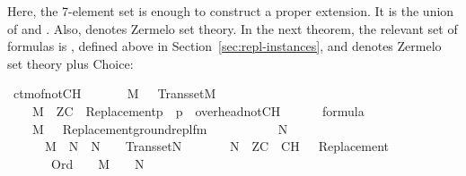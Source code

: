 Here, the 7-element set  is enough to construct a proper
extension. It is  the union of
 and
.
Also,
 denotes Zermelo set theory. In the
next theorem, the relevant set of formulas is
, defined above in
Section~\ref{sec:repl-instances}, and  denotes Zermelo set
theory plus Choice:

\begin{isabelle}
\isamarkupfalse%
\ ctm{\isacharunderscore}{\kern0pt}of{\isacharunderscore}{\kern0pt}not{\isacharunderscore}{\kern0pt}CH{\isacharcolon}{\kern0pt}\isanewline
\ \ \isanewline
\ \ \ \ {\isachardoublequoteopen}M\ {\isasymapprox}\ {\isasymomega}{\isachardoublequoteclose}\ {\isachardoublequoteopen}Transset{\isacharparenleft}{\kern0pt}M{\isacharparenright}{\kern0pt}{\isachardoublequoteclose}\isanewline
\ \ \ \ {\isachardoublequoteopen}M\ {\isasymTurnstile}\ ZC\ {\isasymunion}\ {\isacharbraceleft}{\kern0pt}{\isasymcdot}Replacement{\isacharparenleft}{\kern0pt}p{\isacharparenright}{\kern0pt}{\isasymcdot}\ {\isachardot}{\kern0pt}\ p\ {\isasymin}\ overhead{\isacharunderscore}{\kern0pt}notCH{\isacharbraceright}{\kern0pt}{\isachardoublequoteclose}\isanewline
\ \ \ \ {\isachardoublequoteopen}{\isasymPhi}\ {\isasymsubseteq}\ formula{\isachardoublequoteclose}\isanewline
\ \ \ \ {\isachardoublequoteopen}M\ {\isasymTurnstile}\ {\isacharbraceleft}{\kern0pt}\ {\isasymcdot}Replacement{\isacharparenleft}{\kern0pt}ground{\isacharunderscore}{\kern0pt}repl{\isacharunderscore}{\kern0pt}fm{\isacharparenleft}{\kern0pt}{\isasymphi}{\isacharparenright}{\kern0pt}{\isacharparenright}{\kern0pt}{\isasymcdot}\ {\isachardot}{\kern0pt}\ {\isasymphi}\ {\isasymin}\ {\isasymPhi}{\isacharbraceright}{\kern0pt}{\isachardoublequoteclose}\isanewline
\ \ \isanewline
\ \ \ \ {\isachardoublequoteopen}{\isasymexists}N{\isachardot}{\kern0pt}\isanewline
\ \ \ \ \ \ M\ {\isasymsubseteq}\ N\ {\isasymand}\ N\ {\isasymapprox}\ {\isasymomega}\ {\isasymand}\ Transset{\isacharparenleft}{\kern0pt}N{\isacharparenright}{\kern0pt}\ {\isasymand}\isanewline
\ \ \ \ \ \ N\ {\isasymTurnstile}\ ZC\ {\isasymunion}\ {\isacharbraceleft}{\kern0pt}{\isasymcdot}{\isasymnot}{\isasymcdot}CH{\isasymcdot}{\isasymcdot}{\isacharbraceright}{\kern0pt}\ {\isasymunion}\ {\isacharbraceleft}{\kern0pt}\ {\isasymcdot}Replacement{\isacharparenleft}{\kern0pt}{\isasymphi}{\isacharparenright}{\kern0pt}{\isasymcdot}\ {\isachardot}{\kern0pt}\ {\isasymphi}\ {\isasymin}\ {\isasymPhi}{\isacharbraceright}{\kern0pt}\ {\isasymand}\isanewline
\ \ \ \ \ \ {\isacharparenleft}{\kern0pt}{\isasymforall}{\isasymalpha}{\isachardot}{\kern0pt}\ Ord{\isacharparenleft}{\kern0pt}{\isasymalpha}{\isacharparenright}{\kern0pt}\ {\isasymlongrightarrow}\ {\isacharparenleft}{\kern0pt}{\isasymalpha}\ {\isasymin}\ M\ {\isasymlongleftrightarrow}\ {\isasymalpha}\ {\isasymin}\ N{\isacharparenright}{\kern0pt}{\isacharparenright}{\kern0pt}{\isachardoublequoteclose}
\end{isabelle}


